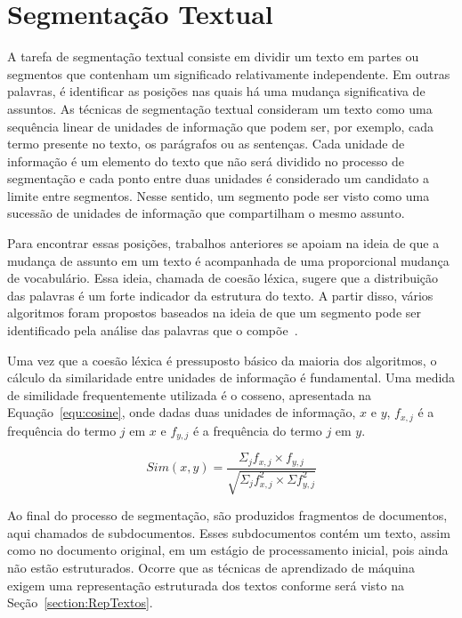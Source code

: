 \section{Segmentação Textual}


A tarefa de segmentação textual consiste em dividir um texto em partes ou segmentos que contenham um significado relativamente independente. Em outras palavras, é identificar as posições nas quais há uma mudança significativa de assuntos. As técnicas de segmentação textual consideram um texto como uma sequência linear de unidades de informação que podem ser, por exemplo, cada termo presente no texto, os parágrafos ou as sentenças. Cada unidade de informação é um elemento do texto que não será dividido no processo de segmentação e cada ponto entre duas unidades é considerado um candidato a limite entre segmentos. Nesse sentido, um segmento pode ser visto como uma sucessão de unidades de informação que compartilham o mesmo assunto.


Para encontrar essas posições, trabalhos anteriores se apoiam na ideia de que a mudança de assunto em um texto é acompanhada de uma proporcional mudança de vocabulário. Essa ideia, chamada de coesão léxica, sugere que a distribuição das palavras é um forte indicador da estrutura do texto. A partir disso, vários algoritmos foram propostos baseados na ideia de que um segmento pode ser identificado pela análise das palavras que o compõe~\cite{Chen2017,Ferret2009,Sakahara2014}.

Uma vez que a coesão léxica é pressuposto básico da maioria dos algoritmos, o cálculo da similaridade entre unidades de informação é fundamental. Uma medida de similidade frequentemente utilizada é o cosseno, apresentada na Equação~\ref{equ:cosine}, onde dadas duas unidades de informação, $x$ e $y$, $f_{x,j}$ é a frequência do termo $j$ em $x$ e $f_{y,j}$ é a frequência do termo $j$ em $y$.

\begin{equation}
	Sim(x,y) = \frac
	{\Sigma_j f_{x,j} \times f_{y,j}}
	{\sqrt{\Sigma_j f^2_{x,j} \times \Sigma f^2_{y,j}}}
	\label{equ:cosine}
\end{equation}










Ao final do processo de segmentação, são produzidos fragmentos de documentos, aqui chamados de subdocumentos. Esses subdocumentos contém um texto, assim como no documento original, em um estágio de processamento inicial, pois ainda não estão estruturados. Ocorre que as técnicas de aprendizado de máquina exigem uma representação estruturada dos textos conforme será visto na Seção~\ref{section:RepTextos}.





